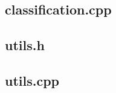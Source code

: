\documentclass[a4paper,12pt,notitlepage]{article}
\begin{document}
\begin{appendices}
		\subsection{classification.cpp}
		\label{app:classificationcpp}
		
		\subsection{utils.h}
		
		\subsection{utils.cpp}
		
\end{appendices}

\vfill
\hrulefill
\end{document}
